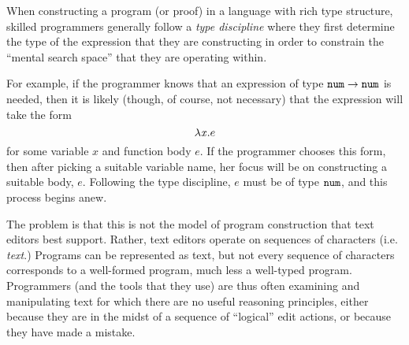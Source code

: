 



When constructing a program (or proof) in a language with rich type structure, skilled programmers generally follow a \emph{type discipline} where they first determine the type of the expression that they are constructing in order to constrain the ``mental search space'' that they are operating within. 

For example, if the programmer knows that an expression of type $\texttt{num} \rightarrow \texttt{num}$ is needed, then it is likely (though, of course, not necessary) that the expression will take the form $$\lambda \mathit{x}.e$$
for some variable $x$ and function body $e$. If the programmer chooses this form, then after picking a suitable variable name, her focus will be on constructing a suitable body, $e$. Following the type discipline, $e$ must be of type $\texttt{num}$, and this process begins anew.

The problem is that this is not the model of program construction that text editors best support.
Rather, text editors operate on sequences of
characters (i.e. \emph{text}.) Programs can be represented as text, but not every sequence of characters corresponds to a well-formed program, much less a well-typed program. Programmers (and the tools that they use) are thus often examining and manipulating text for which there are no useful reasoning principles, either because they are in the midst of a sequence of ``logical'' edit actions, or because they have made a mistake.



